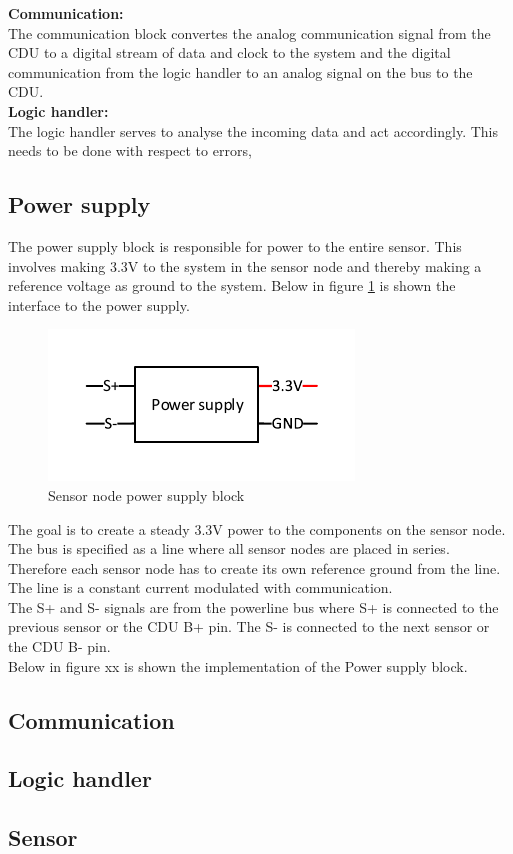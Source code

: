 \textbf{Communication:}\\
The communication block convertes the analog communication signal from the CDU to a digital stream of data and clock to the system and the digital communication from the logic handler to an analog signal on the bus to the CDU.\\

\textbf{Logic handler:}\\
The logic handler serves to analyse the incoming data and act accordingly. This needs to be done with respect to errors, 

\subsection{Power supply}
The power supply block is responsible for power to the entire sensor. This involves making 3.3V to the system in the sensor node and thereby making a reference voltage as ground to the system. Below in figure \ref{fig:SN_PS_FIGURE} is shown the interface to the power supply.
\begin{figure}[H]
\centering
\includegraphics[width=.5\textwidth]{billeder/sn_powersupply_figure}
\caption{Sensor node power supply block}
\label{fig:SN_PS_FIGURE}
\end{figure} 
The goal is to create a steady 3.3V power to the components on the sensor node. The bus is specified as a line where all sensor nodes are placed in series. Therefore each sensor node has to create its own reference ground from the line. The line is a constant current modulated with communication.\\
The S+ and S- signals are from the powerline bus where S+ is connected to the previous sensor or the CDU B+ pin. The S- is connected to the next sensor or the CDU B- pin.\\

Below in figure xx is shown the implementation of the Power supply block.




\subsection{Communication}




\subsection{Logic handler}

\subsection{Sensor}
